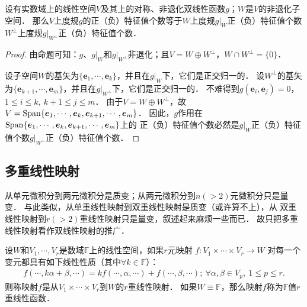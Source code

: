 \begin{proposition}
    设有实数域上的线性空间$V$及其上的对称、非退化双线性函数$g$；$W$是$V$的非退化子空间．
    那么$V$上度规$g$的正（负）特征值个数等于$W$上度规$g|_W$正（负）特征值个数
    $W^\perp$上度规$g|_{W^\perp}$正（负）特征值个数．
\end{proposition}
\begin{proof}
    由命题可知：$g$、$g|_W$和$g|_{W^\perp}$非退化；且$V=W\oplus W^\perp$，$W\cap W^\perp=\{0\}$．
    
    设子空间$W$的基矢为$\{\boldsymbol{e}_1,\cdots,\boldsymbol{e}_k\}$，并且在$g|_W$下，它们是正交归一的．
    设$W^\perp$的基矢为$\{\boldsymbol{e}_{k+1},\cdots,\boldsymbol{e}_m\}$，并且在$g|_{W^\perp}$下，它们是正交归一的．
    不难得到$g(\boldsymbol{e}_i,\boldsymbol{e}_j)=0$，$1\leqslant i\leqslant k,\ k+1 \leqslant j \leqslant m $．    
    由于$V=W\oplus W^\perp$，故$V={\rm Span}\{\boldsymbol{e}_1,\cdots,\boldsymbol{e}_k,\boldsymbol{e}_{k+1},\cdots,\boldsymbol{e}_m\}$．
    因此，$g$作用在${\rm Span}\{\boldsymbol{e}_1,\cdots,\boldsymbol{e}_k,\boldsymbol{e}_{k+1},\cdots,\boldsymbol{e}_m\}$上的
    正（负）特征值个数必然是$g|_W$正（负）特征值个数$g|_{W^\perp}$正（负）特征值个数．
\end{proof}









\subsection{多重线性映射}\label{chmla:sec_multi-linear-function}
从单元微积分到两元微积分是质变；从两元微积分到$n(>2)$元微积分只是量变．
与此类似，从单重线性映射到双重线性映射是质变（或许算不上），从
双重线性映射到$r(>2)$重线性映射只是量变，叙述起来麻烦一些而已．
故只把多重线性映射看作双线性映射的推广．
\begin{definition}\label{chmla:def_nlinear-fun}
    设$W$和$V_1,\cdots,V_r$是数域$\mathbb{F}$上的线性空间，如果$r$元映射
    $f:V_1 \times  \cdots \times V_r \to W$
    对每一个变元都具有如下线性性质（其中$\forall k \in \mathbb{F}$）： 
    \begin{align*}
        f(\cdots, k\alpha+\beta, \cdots )= k f(\cdots,\alpha,\cdots) + f(\cdots,\beta,\cdots);
        \  \forall \alpha,\beta \in V_p ,  \  1 \leqslant p \leqslant r.
    \end{align*}
    则称映射$f$是从$V_1 \times  \cdots \times V_r$到$W$的$r${\heiti 重线性映射}．
    如果$W\equiv \mathbb{F}$，那么映射$f$称为$\mathbb{F}$值$r${\heiti 重线性函数}．
\end{definition}

